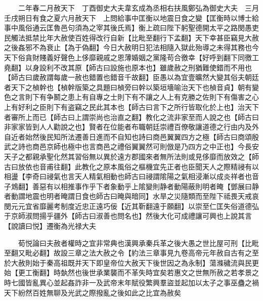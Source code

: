 　　二年春二月赦天下　丁酉御史大夫韋玄成為丞相右扶風鄭弘為御史大夫　三月壬戌朔日有食之夏六月赦天下　上問給事中匡衡以地震日食之變【匡衡時以博士給事中風俗通云匡魯邑句須為之宰其後氏焉】衡上疏曰陛下躬聖德開太平之路閔愚吏民觸法抵禁比年大赦使百姓得改行自新【比毗至翻行下孟翻】天下幸甚臣竊見大赦之後姦邪不為衰止【為于偽翻】今日大赦明日犯法相隨入獄此殆導之未得其務也今天下俗貪財賤義好聲色上侈靡親戚之恩薄婚姻之黨隆苟合徼幸【好呼到翻下同徼工堯翻】以身設利不改其原【師古曰設施也原本也】雖歲赦之刑猶難使錯而不用也【師古曰歲赦謂每歲一赦也錯置也錯音千故翻】臣愚以為宜壹曠然大變其俗夫朝廷者天下之楨幹也【楨幹版築之具題曰楨旁曰幹以築垣墻喻治天下也楨音貞】朝有變色之言則下有争鬭之患上有自專之士則下有不讓之人上有克勝之佐則下有傷害之心上有好利之臣則下有盗竊之民此其本也【師古曰言下之所行皆取化於上也】治天下者審所上而已【師古曰上謂崇尚也治直之翻】教化之流非家至而人說之也【師古曰非家家皆到人人勸說之也】賢者在位能者布職朝廷崇禮百僚敬讓道德之行由内及外自近者始然後民知所法遷善日進而不自知也詩曰商邑翼翼四方之極【師古曰商頌殷武之詩也商邑京師也極中也言商邑之禮俗翼翼然可則倣是乃四方之中正也】今長安天子之都親承聖化然其習俗無以異於遠方郡國來者無所法則或見侈靡而放效之【師古曰放依也音甫往翻】此教化之原本風俗之樞機宜先正者也臣聞天人之際精祲有以相盪【李奇曰祲氣也言天人精氣相動也師古曰祲謂隂陽之氣相浸漸以成炎祥者也音子鴆翻】善惡有以相推事作乎下者象動乎上隂變則静者動陽蔽則明者晻【鄧展曰静者動謂地震也明者晻謂日食也師古曰晻與暗同】水旱之災隨類而至陛下祗畏天戒哀閔元元宜省靡麗考制度近忠正遠巧佞【近其靳翻遠于願翻】以崇至仁匡失俗道德弘于京師淑問揚乎疆外【師古曰淑善也問名也】然後大化可成禮讓可興也上說其言【說讀曰悦】遷衡為光禄大夫

　　荀悦論曰夫赦者權時之宜非常典也漢興承秦兵革之後大愚之世比屋可刑【比毗至翻又毗必翻】故設三章之法大赦之令【約法三章事見九卷高帝元年赦自古有之至於大赦則始于秦高祖既并天下即皇帝位大赦天下後世因之為永制】蕩滌穢流與民更始【更工衡翻】時埶然也後世承業襲而不革失時宜矣若惠文之世無所赦之若孝景之時七國皆亂異心並起姦詐非一及武帝末年賦役繁興羣盜並起加以太子之事巫蠱之禍天下紛然百姓無聊及光武之際撥亂之後如此之比宜為赦矣

